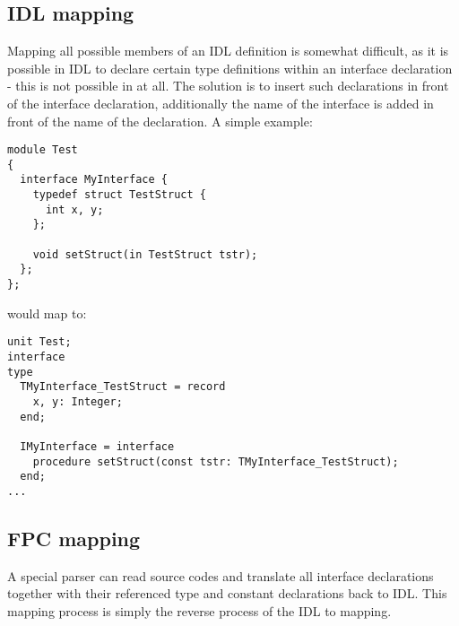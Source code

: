 \documentclass{report}
\begin{document}

\subsection{IDL mapping}
Mapping all possible members of an IDL definition is somewhat difficult, as it
is possible in IDL to declare certain type definitions within an interface
declaration - this is not possible in \fpc at all. The solution is to insert
such declarations in front of the interface declaration, additionally the name
of the interface is added in front of the name of the declaration.
\newline A simple example:
\begin{verbatim}
module Test
{
  interface MyInterface {
    typedef struct TestStruct {
      int x, y;
    };

    void setStruct(in TestStruct tstr);
  };
};
\end{verbatim}
would map to:
\begin{verbatim}
unit Test;
interface
type
  TMyInterface_TestStruct = record
    x, y: Integer;
  end;

  IMyInterface = interface
    procedure setStruct(const tstr: TMyInterface_TestStruct);
  end;
...
\end{verbatim}


\subsection{FPC mapping}
A special parser can read \fpc source codes and translate all interface
declarations together with their referenced type and constant declarations back
to IDL. This mapping process is simply the reverse process of the IDL to \fpc
mapping.

\end{document}
